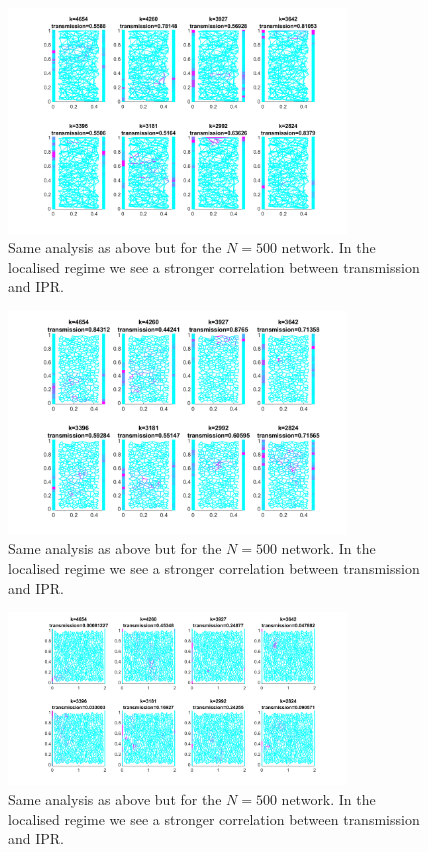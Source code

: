\begin{figure}[h]
  \centering
    \includegraphics[width=0.8\textwidth]{ch3/fig3/kmodes_N500D05d.png}
    \caption{Same analysis as above but for the $N=500$ network. In the localised regime we see a stronger correlation between transmission and IPR.} 
    \label{fig:kmodes_N500D05d}
\end{figure}

\begin{figure}[h]
  \centering
    \includegraphics[width=0.8\textwidth]{ch3/fig3/kmodes_N500D05v.png}
    \caption{Same analysis as above but for the $N=500$ network. In the localised regime we see a stronger correlation between transmission and IPR.} 
    \label{fig:kmodes_N500D05v}
\end{figure}

\begin{figure}[h]
  \centering
    \includegraphics[width=0.8\textwidth]{ch3/fig3/kmodes_N1000D20v.png}
    \caption{Same analysis as above but for the $N=500$ network. In the localised regime we see a stronger correlation between transmission and IPR.} 
    \label{fig:kmodes_N1000D20V}
\end{figure}



